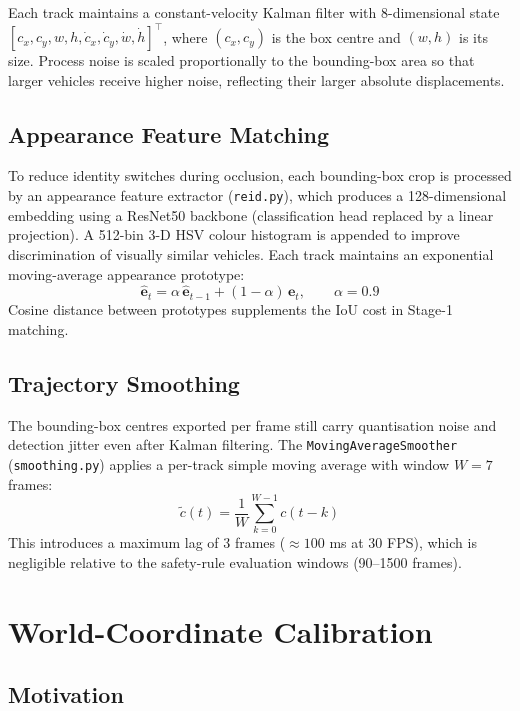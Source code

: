 Each track maintains a constant-velocity Kalman filter with 8-dimensional state
$[c_x, c_y, w, h, \dot{c}_x, \dot{c}_y, \dot{w}, \dot{h}]^\top$, where $(c_x, c_y)$ is
the box centre and $(w, h)$ is its size.  Process noise is scaled proportionally to the
bounding-box area so that larger vehicles receive higher noise, reflecting their larger
absolute displacements.

\subsection{Appearance Feature Matching}

To reduce identity switches during occlusion, each bounding-box crop is processed by an appearance feature extractor (\texttt{reid.py}), which produces a 128-dimensional embedding using a ResNet50 backbone (classification head replaced by a linear projection).  A 512-bin 3-D HSV colour histogram is appended to improve discrimination of visually similar vehicles. Each track maintains an exponential moving-average appearance prototype:
\begin{equation}
    \hat{\mathbf{e}}_t = \alpha\,\hat{\mathbf{e}}_{t-1} + (1-\alpha)\,\mathbf{e}_t,
    \qquad \alpha = 0.9
    \label{eq:ema}
\end{equation}
Cosine distance between prototypes supplements the IoU cost in Stage-1 matching.

\subsection{Trajectory Smoothing}

The bounding-box centres exported per frame still carry quantisation noise and
detection jitter even after Kalman filtering.  The \texttt{MovingAverageSmoother}
(\texttt{smoothing.py}) applies a per-track simple moving average with window $W = 7$
frames:
\begin{equation}
    \tilde{c}(t) = \frac{1}{W}\sum_{k=0}^{W-1} c(t-k)
    \label{eq:sma}
\end{equation}
This introduces a maximum lag of 3 frames ($\approx 100$ ms at 30 FPS), which is negligible
relative to the safety-rule evaluation windows (90--1500 frames).

\section{World-Coordinate Calibration}
\label{sec:calibration}

\subsection{Motivation}


